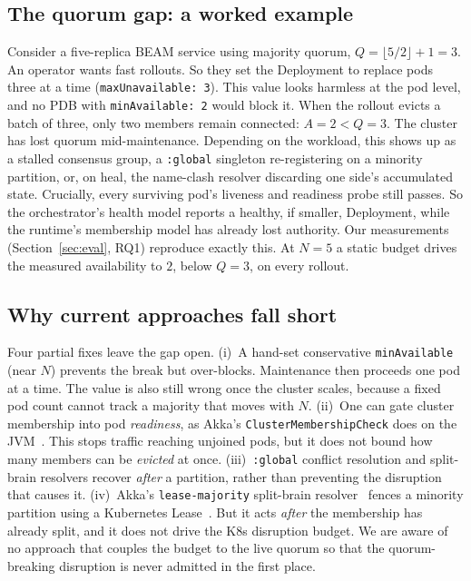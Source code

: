 \documentclass[AMA,Times1COL]{WileyNJDv5}
\begin{document}
\subsection{The quorum gap: a worked example}\label{sec:bg-gap}
Consider a five-replica BEAM service using majority quorum, $Q=\lfloor5/2\rfloor+1=3$. An operator wants
fast rollouts. So they set the Deployment to replace pods three at a time (\texttt{maxUnavailable: 3}).
This value looks harmless at the pod level, and no PDB with \texttt{minAvailable: 2} would block it. When
the rollout evicts a batch of three, only two members remain connected: $A=2<Q=3$. The cluster has lost
quorum mid-maintenance. Depending on the workload, this shows up as a stalled consensus group, a
\texttt{:global} singleton re-registering on a minority partition, or, on heal, the name-clash resolver
discarding one side's accumulated state. Crucially, every surviving pod's liveness and readiness probe
still passes. So the orchestrator's health model reports a healthy, if smaller, Deployment, while the
runtime's membership model has already lost authority. Our measurements (Section~\ref{sec:eval}, RQ1)
reproduce exactly this. At $N=5$ a static budget drives the measured availability to $2$, below $Q=3$, on
every rollout.

\subsection{Why current approaches fall short}\label{sec:bg-existing}
Four partial fixes leave the gap open. (i)~A hand-set conservative \texttt{minAvailable} (near $N$)
prevents the break but over-blocks. Maintenance then proceeds one pod at a time. The value is also still
wrong once the cluster scales, because a fixed pod count cannot track a majority that moves with $N$.
(ii)~One can gate cluster membership into pod \emph{readiness}, as Akka's \texttt{ClusterMembershipCheck}
does on the JVM~\cite{akkaHealth}. This stops traffic reaching unjoined pods, but it does not bound how
many members can be \emph{evicted} at once. (iii)~\texttt{:global} conflict resolution and split-brain
resolvers recover \emph{after} a partition, rather than preventing the disruption that causes it.
(iv)~Akka's \texttt{lease-majority} split-brain resolver~\cite{akkaSBR} fences a minority partition using
a Kubernetes Lease~\cite{akkaLease}. But it acts \emph{after} the membership has already split, and it
does not drive the K8s disruption budget. We are aware of no approach that couples the budget to the live
quorum so that the quorum-breaking disruption is never admitted in the first place.
\end{document}
